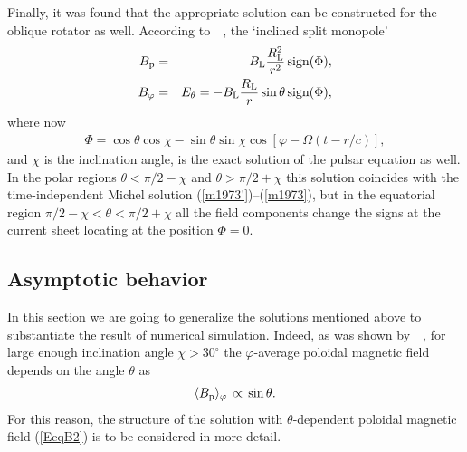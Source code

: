 \documentclass[useAMS,usenatbib]{mn2e}
\begin{document}
Finally, it was found that the appropriate solution can be constructed for the oblique
rotator as well. According to~~\citet{1999A&A...349.1017B}, the `inclined split monopole'
\begin{eqnarray}
B_{\rm p} & = & B_{\rm L}\frac{R_{\rm L}^2}{r^2} \, {\rm sign}(\Phi), \\
B_{\varphi} & = & E_{\theta} = -B_{\rm L}\frac{R_{\rm L}}{r}\sin\theta \, {\rm sign}(\Phi),
\label{b1999}
\end{eqnarray}
where now
\begin{eqnarray}
\Phi = \cos\theta \cos\chi - \sin\theta \sin\chi \cos\left[\varphi - \Omega \left(t - r/c\right)\right],
\label{Phi}
\end{eqnarray}
and $\chi$ is the inclination angle, is the exact solution of the pulsar equation as well.
In the polar regions \mbox{$\theta < \pi/2 - \chi$} and \mbox{$\theta > \pi/2 + \chi$}
this solution coincides with the time-independent Michel solution (\ref{m1973'})--(\ref{m1973}),
but in the equatorial region $\pi/2 - \chi < \theta < \pi/2 + \chi$ all the field components
change the signs at the current sheet locating at the position $\Phi = 0$.

\subsection{Asymptotic behavior}
\label{sect:Axis}

In this section we are going to generalize the solutions mentioned above to substantiate
the result of numerical simulation. Indeed, as was shown by~~\citet{SashaMHD}, for large enough
inclination angle $\chi > 30^{\circ}$ the $\varphi$-average poloidal magnetic field depends
on the angle $\theta$ as
\begin{eqnarray}
\langle B_{\rm p} \rangle_{\varphi} \, \propto \, \sin\theta.
\label{Bpp}
\end{eqnarray}
For this reason, the structure of the solution with $\theta$-dependent poloidal magnetic field
(\ref{EeqB2}) is to be considered in more detail.
\end{document}
